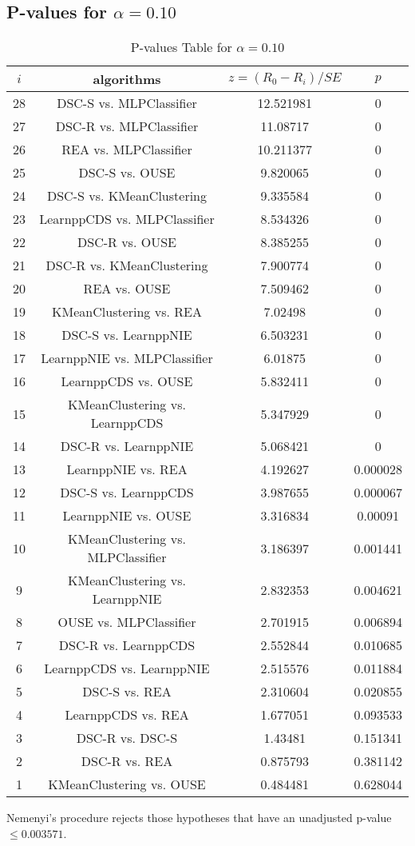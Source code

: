 \documentclass[a4paper,10pt]{article}
\begin{document}
\begin{landscape}
\pagebreak

\subsection{P-values for $\alpha=0.10$}

\begin{table}[!htp]
\centering\scriptsize
\begin{tabular}{cccc}
$i$&algorithms&$z=(R_0 - R_i)/SE$&$p$\\
\hline28&DSC-S vs. MLPClassifier&12.521981&0\\
27&DSC-R vs. MLPClassifier&11.08717&0\\
26&REA vs. MLPClassifier&10.211377&0\\
25&DSC-S vs. OUSE&9.820065&0\\
24&DSC-S vs. KMeanClustering&9.335584&0\\
23&LearnppCDS vs. MLPClassifier&8.534326&0\\
22&DSC-R vs. OUSE&8.385255&0\\
21&DSC-R vs. KMeanClustering&7.900774&0\\
20&REA vs. OUSE&7.509462&0\\
19&KMeanClustering vs. REA&7.02498&0\\
18&DSC-S vs. LearnppNIE&6.503231&0\\
17&LearnppNIE vs. MLPClassifier&6.01875&0\\
16&LearnppCDS vs. OUSE&5.832411&0\\
15&KMeanClustering vs. LearnppCDS&5.347929&0\\
14&DSC-R vs. LearnppNIE&5.068421&0\\
13&LearnppNIE vs. REA&4.192627&0.000028\\
12&DSC-S vs. LearnppCDS&3.987655&0.000067\\
11&LearnppNIE vs. OUSE&3.316834&0.00091\\
10&KMeanClustering vs. MLPClassifier&3.186397&0.001441\\
9&KMeanClustering vs. LearnppNIE&2.832353&0.004621\\
8&OUSE vs. MLPClassifier&2.701915&0.006894\\
7&DSC-R vs. LearnppCDS&2.552844&0.010685\\
6&LearnppCDS vs. LearnppNIE&2.515576&0.011884\\
5&DSC-S vs. REA&2.310604&0.020855\\
4&LearnppCDS vs. REA&1.677051&0.093533\\
3&DSC-R vs. DSC-S&1.43481&0.151341\\
2&DSC-R vs. REA&0.875793&0.381142\\
1&KMeanClustering vs. OUSE&0.484481&0.628044\\
\hline
\end{tabular}
\caption{P-values Table for $\alpha=0.10$}
\end{table}Nemenyi's procedure rejects those hypotheses that have an unadjusted p-value $\le0.003571$.


\end{landscape}
\end{document}
